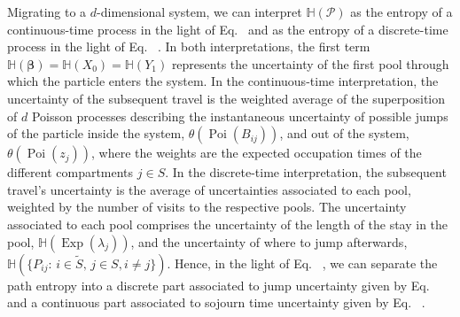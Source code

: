 \documentclass[smallextended]{svjour3}
\makeatletter
\renewcommand*{\eqref}[1]{%
  \hyperref[{#1}]{\textup{\tagform@{\ref*{#1}}}}%
}
\renewcommand{\vec}[1]{\mathbf{#1}}
\renewcommand{\H}{\mathbb{H}}
\newcommand{\Exp}{\operatorname{Exp}}
\newcommand{\Poi}{\operatorname{Poi}}
\makeatother
\begin{document}
Migrating to a $d$-dimensional system, we can interpret $\H(\mathcal{P})$ as the entropy of a continuous-time process in the light of Eq.~\eqref{eqn:H_occupation_time} and as the entropy of a discrete-time process in the light of Eq.~\eqref{eqn:H_number_of_visits}.
In both interpretations, the first term $\H(\vec{\beta})=\H(X_0)=\H(Y_1)$ represents the uncertainty of the first pool through which the particle enters the system.
In the continuous-time interpretation, the uncertainty of the subsequent travel is the weighted average of the superposition of $d$ Poisson processes describing the instantaneous uncertainty of possible jumps of the particle inside the system, $\theta(\Poi(B_{ij}))$, and out of the system, $\theta(\Poi(z_j))$, where the weights are the expected occupation times of the different compartments $j\in S$. 
In the discrete-time interpretation, the subsequent travel's uncertainty is the average of uncertainties associated to each pool, weighted by the number of visits to the respective pools.
The uncertainty associated to each pool comprises the uncertainty of the length of the stay in the pool, $\H(\Exp(\lambda_j))$, and the uncertainty of where to jump afterwards, $\H(\{P_{ij}:\,i\in\widetilde{S},\,j\in S,i\neq j\})$.
Hence, in the light of Eq.~\eqref{eqn:H_number_of_visits}, we can separate the path entropy into a discrete part associated to jump uncertainty given by Eq.~\eqref{eqn:H_discrete} and a continuous part associated to sojourn time uncertainty given by Eq.~\eqref{eqn:H_continuous}.
\end{document}
